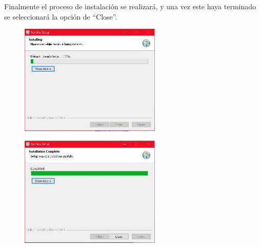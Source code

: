\documentclass[10pt,a4paper]{article} %
\begin{document}
\begin{enumerate}
{			\item Finalmente el proceso de instalaci{\'o}n se realizar{\'a}, y una vez este haya terminado se seleccionar{\'a} la opci{\'o}n de ``Close''.
			\begin{figure}[H]
				\includegraphics[width=0.6\textwidth]{5.jpg}
				\centering
				\label{img:paso5}
				
				
				\vspace{0.5cm}
				\includegraphics[width=0.6\textwidth]{6.jpg}
				\centering
				\label{img:paso6}
			\end{figure}
		}
	\end{enumerate}
	
	\pagebreak
	
\end{document}
